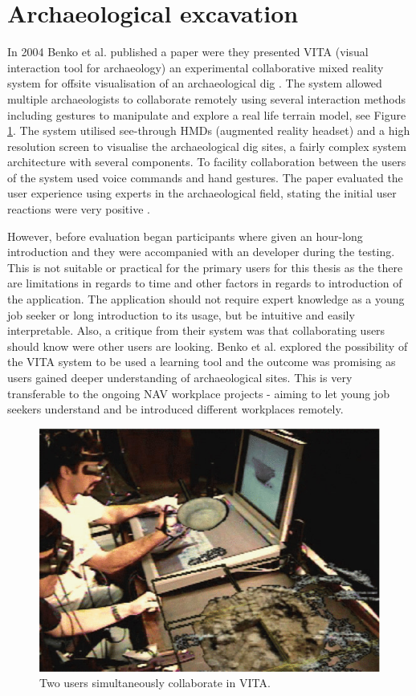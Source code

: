 \section{Archaeological excavation}
In 2004 Benko et al. published a paper were they presented VITA (visual interaction tool for archaeology) an experimental collaborative mixed reality system for offsite visualisation of an archaeological dig \cite{benko2004collaborative}. The system allowed multiple archaeologists to collaborate remotely using several interaction methods including gestures to manipulate and explore a real life terrain model, see Figure \ref{fig:VITA}. The system utilised see-through HMDs (augmented reality headset) and a high resolution screen to visualise the archaeological dig sites, a fairly complex system architecture with several components. To facility collaboration between the users of the system used voice commands and hand gestures. The paper evaluated the user experience using experts in the archaeological field, stating the initial user reactions were very positive \cite{benko2004collaborative}.

However, before evaluation began participants where given an hour-long introduction and they were accompanied with an developer during the testing. This is not suitable or practical for the primary users for this thesis as the there are limitations in regards to time and other factors in regards to introduction of the application. The application should not require expert knowledge as a young job seeker or long introduction to its usage, but be intuitive and easily interpretable. Also, a critique from their system was that collaborating users should know were other users are looking.
Benko et al. explored the possibility of the VITA system to be used a learning tool and the outcome was promising as users gained deeper understanding of archaeological sites. This is very transferable to the ongoing NAV workplace projects - aiming to let young job seekers understand and be introduced different workplaces remotely.      

\begin{figure}[!h]
    \centering
    \includegraphics[width=.7\textwidth]{./fig/related_work/VITA.jpeg}
    \caption{Two users simultaneously collaborate in VITA. \cite{benko2004collaborative}}
    \label{fig:VITA}
\end{figure}


